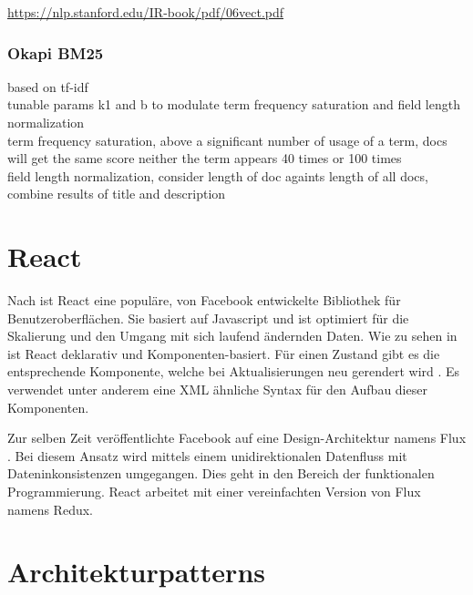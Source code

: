 \url{https://nlp.stanford.edu/IR-book/pdf/06vect.pdf}\\

\subsubsection{Okapi BM25}
based on tf-idf\\
tunable params k1 and b to modulate term frequency saturation and field length normalization\\
term frequency saturation, above a significant number of usage of a term, docs will get the same score neither the term appears 40 times or 100 times\\
field length normalization, consider length of doc againts length of all docs, combine results of title and description




\section{React}\label{react}



Nach \cite[S.~11-16]{reactflux} ist React eine populäre, von Facebook entwickelte Bibliothek für Benutzeroberflächen. Sie basiert auf Javascript und ist optimiert für die Skalierung und den Umgang mit sich laufend ändernden Daten. Wie zu sehen in \cite{ReactAJa3:online} ist React deklarativ und Kom\-po\-nent\-en-bas\-iert. Für einen Zustand gibt es die entsprechende Komponente, welche bei Aktualisierungen neu gerendert wird . Es verwendet unter anderem eine XML ähnliche Syntax für den Aufbau dieser Komponenten.

Zur selben Zeit veröffentlichte Facebook auf eine Design-Architektur namens Flux \cite[S.~12]{reactflux}. Bei diesem Ansatz wird mittels einem unidirektionalen Datenfluss mit Dateninkonsistenzen umgegangen. Dies geht in den Bereich der funktionalen Programmierung. React arbeitet mit einer vereinfachten Version von Flux namens Redux.



\section{Architekturpatterns}

